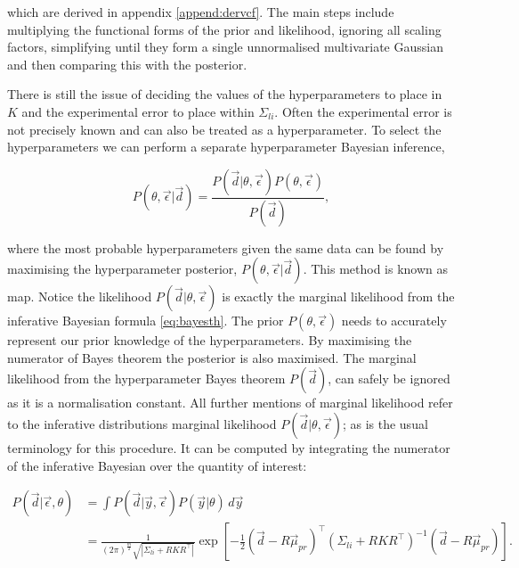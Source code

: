 \noindent which are derived in appendix \ref{append:dervcf}. The main steps include multiplying the functional forms of the prior and likelihood, ignoring all scaling factors, simplifying until they form a single unnormalised multivariate Gaussian and then comparing this with the posterior. 

There is still the issue of deciding the values of the hyperparameters to place in $K$ and the experimental error to place within $\Sigma_{li}$. Often the experimental error is not precisely known and can also be treated as a hyperparameter. To select the hyperparameters we can perform a separate hyperparameter Bayesian inference,

\begin{equation}
  P(\theta, \vec{\epsilon}|\vec d) = \frac{P(\vec d|\theta, \vec{\epsilon}) P(\theta,\vec{\epsilon})}{P(\vec d)},
  \label{eq:parambayes}
\end{equation}

where the most probable hyperparameters given the same data can be found by maximising the hyperparameter posterior, $P(\theta,\vec{\epsilon}|\vec d)$. This method is known as \gls{map}. Notice the likelihood $P(\vec d| \theta, \vec{\epsilon})$ is exactly the marginal likelihood from the inferative Bayesian formula \ref{eq:bayesth}. The prior $P(\theta, \vec{\epsilon})$ needs to accurately represent our prior knowledge of the hyperparameters. By maximising the numerator of Bayes theorem the posterior is also maximised. The marginal likelihood from the hyperparameter Bayes theorem $P(\vec d)$, can safely be ignored as it is a normalisation constant. All further mentions of marginal likelihood refer to the inferative distributions marginal likelihood $P(\vec d|\theta,\vec{\epsilon})$; as is the usual terminology for this procedure. It can be computed by integrating the numerator of the inferative Bayesian over the quantity of interest:

\begin{equation}
  \begin{aligned}
   P(\vec d|\vec\epsilon,\theta) &= \int P(\vec{d}|\vec{y},\vec\epsilon)P(\vec{y}|\theta)  \, d\vec y \\
   &= \frac{1}{(2\pi)^{\frac{m}{2}} \sqrt{|\Sigma_{li} + RKR^\top|}} \exp\left[ -\frac{1}{2} (\vec{d} - R\vec{\mu}_{pr})^{\top} (\Sigma_{li} + R K R^{\top})^{-1} (\vec{d} - R\vec{\mu}_{pr}) \right].
   \label{eq:margeli}
  \end{aligned}
\end{equation}

